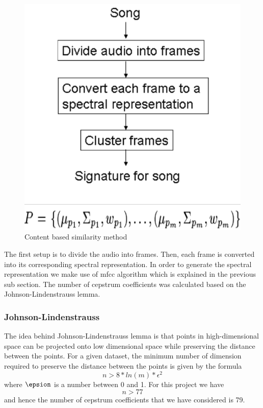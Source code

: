 \documentclass[12pt]{article}
\begin{document}
\begin{figure}[h]\label{content}
\center
\includegraphics{fig1.png}
\caption{Content based similarity method}
\end{figure}

The first setup is to divide the audio into frames. Then, each frame is converted into its corresponding spectral representation. In order to generate the spectral representation we make use of mfcc algorithm which is explained in the previous sub section. The number of cepstrum coefficients was calculated based on the Johnson-Lindenstrauss lemma.

\subsubsection{Johnson-Lindenstrauss}
The idea behind Johnson-Lindenstrauss lemma
is that points in high-dimensional space can be projected onto low dimensional space while preserving the distance between the points. For a given dataset, the minimum number of dimension required to preserve the distance between the points is given by the formula $$ n > 8 * ln(m) * \epsilon ^ 2 $$ where $\epsion$ is a number between 0 and 1. For this project we have $$ n > 77$$ and hence the number of cepstrum coefficients that we have considered is 79.
\end{document}
